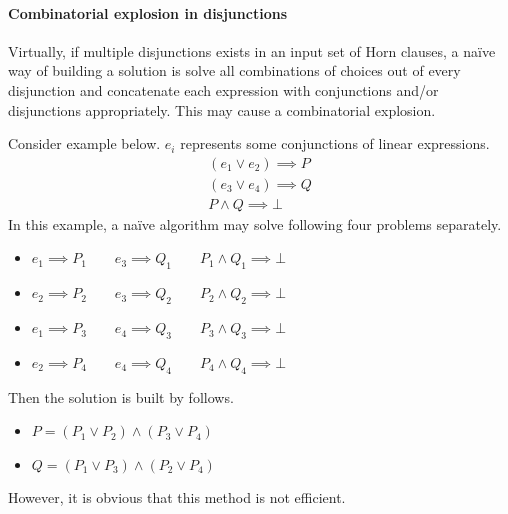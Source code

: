 


\paragraph{Combinatorial explosion in disjunctions}
Virtually, if multiple disjunctions exists in an input set of Horn
clauses, a na\"{i}ve way of building a solution is solve all
combinations of choices out of every disjunction and concatenate each
expression with conjunctions and/or disjunctions appropriately.  This
may cause a combinatorial explosion.

Consider example below. $e_i$ represents some conjunctions of linear
expressions.
\begin{align*}
(e_1 \vee e_2) \implies P \\ (e_3 \vee e_4) \implies Q \\ P \wedge Q \implies \bot
\end{align*}
In this example, a na\"{i}ve algorithm may solve following four
problems separately.
\vspace*{-8pt}\begin{itemize}\itemsep-3pt
\item $e_1 \implies P_1 \qquad e_3 \implies Q_1 \qquad P_1 \wedge Q_1 \implies \bot$
\item $e_2 \implies P_2 \qquad e_3 \implies Q_2 \qquad P_2 \wedge Q_2 \implies \bot$
\item $e_1 \implies P_3 \qquad e_4 \implies Q_3 \qquad P_3 \wedge Q_3 \implies \bot$
\item $e_2 \implies P_4 \qquad e_4 \implies Q_4 \qquad P_4 \wedge Q_4 \implies \bot$
\end{itemize}
Then the solution is built by follows.
\vspace*{-4pt}\begin{itemize}\itemsep-3pt
\item $P = ( P_1 \vee P_2 ) \wedge ( P_3 \vee P_4 )$
\item $Q = ( P_1 \vee P_3 ) \wedge ( P_2 \vee P_4 )$
\end{itemize}
However, it is obvious that this method is not efficient.

